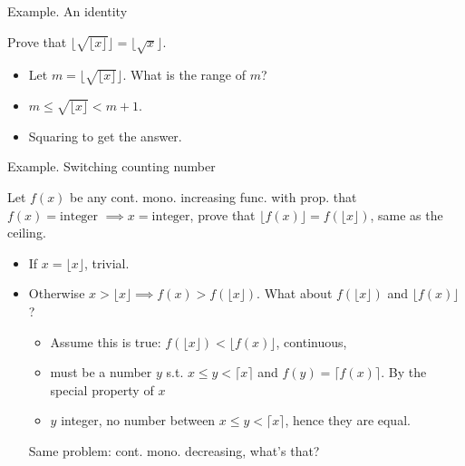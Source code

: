 \begin{frame}{Example. An identity}
 \begin{example}
     Prove that $\lfloor \sqrt{\lfloor x \rfloor} \rfloor = \lfloor \sqrt{x} \rfloor$.
 \end{example}
    
    \pause
    \begin{itemize}
        \item Let $m=\lfloor \sqrt{\lfloor x \rfloor} \rfloor$. What is the range of $m$? 
        \item $m\leq \sqrt{\lfloor x \rfloor} < m+1$. 
        \item Squaring to get the answer. 
    \end{itemize}
    
\end{frame}

\begin{frame}{Example. Switching counting number}
\begin{example}
    Let $f(x)$ be any cont. mono. increasing func. with prop. that 
    $f(x) = \text{integer } \implies x=\text{integer}$, prove that 
    $\lfloor f(x) \rfloor = f(\lfloor x \rfloor)$, same as the ceiling. 
\end{example}

\pause 
\begin{itemize}
    \item If $x=\lfloor x \rfloor$, trivial. 
    \item Otherwise $x>\lfloor x \rfloor \implies f(x)>f(\lfloor x \rfloor)$. What about $f(\lfloor x \rfloor)$ and $\lfloor f( x )\rfloor$? 
    \begin{itemize}
        \item Assume this is true: $f(\lfloor x \rfloor)<\lfloor f( x )\rfloor$, continuous, 
        \item must be a number $y$ s.t. $x\leq y < \lceil x \rceil$ and $f(y)=\lceil f(x) \rceil$. By the special property of $x$
        \item $y$ integer, no number between $x\leq y < \lceil x \rceil$, hence they are equal. 
    \end{itemize}

    Same problem: cont. mono. decreasing, what's that?
\end{itemize}
\end{frame}

